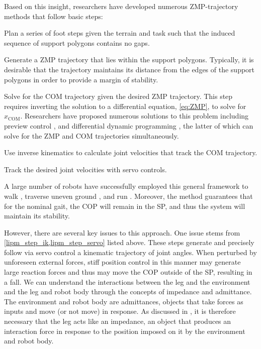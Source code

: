 Based on this insight, researchers have developed numerous ZMP-trajectory
methods that follow  basic steps:
\begin{steps}
    \item Plan a series of foot steps given the terrain and task such that the
    induced sequence of support polygons contains no
    gaps.\label{lipm_step_foot_plan}

    \item Generate a ZMP trajectory that lies within the support polygons.
    Typically, it is desirable that the trajectory maintains its distance from
    the edges of the support polygons in order to provide a margin of
    stability.\label{lipm_step_zmp_traj}

    \item Solve for the COM trajectory given the desired ZMP trajectory. This
    step requires inverting the solution to a differential equation,
    \cref{eq:ZMP}, to solve for $x_\textrm{COM}$. Researchers have proposed
    numerous solutions to this problem including preview control
    \citep{kajita2003biped}, and differential dynamic programming
    \citep{feng2015optimization}, the latter of which can solve for the ZMP and
    COM trajectories simultaneously.\label{lipm_step_com_traj}
    
    \item Use inverse kinematics to calculate joint velocities that track the
    COM trajectory.\label{lipm_step_ik}

    \item Track the desired joint velocities with servo
    controls.\label{lipm_step_servo}
\end{steps}

A large number of robots have successfully employed this general framework to
walk \citep{hirai1998development}, traverse uneven ground
\citep{shimmyo2010biped}, and run \citep{kajita2007zmp}. Moreover, the method
guarantees that for the nominal gait, the COP will remain in the SP, and thus
the system will maintain its stability.

However, there are several key issues to this approach. One issue stems from
\cref{lipm_step_ik,lipm_step_servo} listed above. These steps generate and
precisely follow via servo control a kinematic trajectory of joint angles. When
perturbed by unforeseen external forces, stiff position control in this manner
may generate large reaction forces and thus may move the COP outside of the SP,
resulting in a fall. We can understand the interactions between the leg and the
environment and the leg and robot body through the concepts of impedance and
admittance. The environment and robot body are admittances, objects that take
forces as inputs and move (or not move) in response. As discussed in
\citet{hogan1985impedance}, it is therefore necessary that the leg acts like an
impedance, an object that produces an interaction force in response to the
position imposed on it by the environment and robot body.

